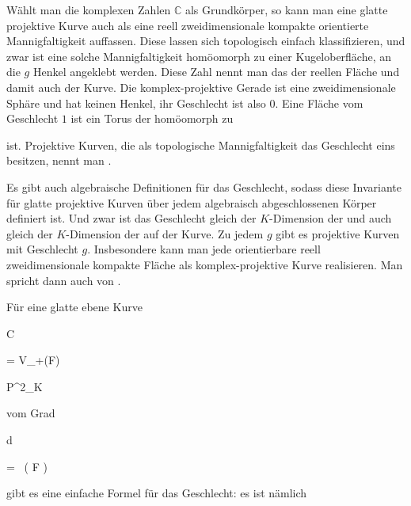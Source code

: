 {


Wählt man die komplexen Zahlen ${\mathbb C}$ als Grundkörper, so kann man eine glatte projektive Kurve auch als eine reell zweidimensionale kompakte orientierte Mannigfaltigkeit auffassen. Diese lassen sich topologisch einfach klassifizieren, und zwar ist eine solche Mannigfaltigkeit homöomorph zu einer Kugeloberfläche, an die $g$ Henkel angeklebt werden. Diese Zahl nennt man das  {} der reellen Fläche und damit auch der Kurve. Die komplex-projektive Gerade ist eine zweidimensionale Sphäre und hat keinen Henkel, ihr Geschlecht ist also $0$. Eine Fläche vom Geschlecht $1$ ist ein Torus
 {} {}
der homöomorph zu

 ist. Projektive Kurven, die als topologische Mannigfaltigkeit das Geschlecht eins besitzen, nennt man  {.}


Es gibt auch algebraische Definitionen für das Geschlecht, sodass diese Invariante für glatte projektive Kurven über jedem algebraisch abgeschlossenen Körper definiert ist. Und zwar ist das Geschlecht gleich der $K$-Dimension der  {} und auch gleich der $K$-Dimension der  {} auf der Kurve. Zu jedem $g$ gibt es projektive Kurven mit Geschlecht $g$. Insbesondere kann man jede orientierbare reell zweidimensionale kompakte Fläche als komplex-projektive Kurve realisieren. Man spricht dann auch von  {.}


Für eine glatte ebene Kurve


\mavergleichskette

{\vergleichskette

{C
}

{ = }{ V_+(F)
}

{ \subset }{ {\mathbb P}^{2}_{K}
}

{    }{
}

{   }{
}

}
{}{}{}
vom Grad


\mavergleichskette

{\vergleichskette

{d
}

{ = }{  \, ( F )
}

{  }{
}

{    }{
}

{   }{
}

}
{}{}{}
gibt es eine einfache Formel für das Geschlecht: es ist nämlich


}
